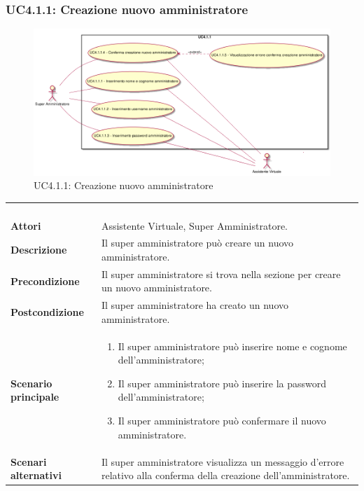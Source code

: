 \newpage\subsubsection{UC4.1.1: Creazione nuovo amministratore}
\label{UC4.1.1}
\begin{figure}[h]
\centering
\includegraphics[width=\textwidth,height=\textheight,keepaspectratio]{images/UseCaseUC411.png}
\caption{UC4.1.1: Creazione nuovo amministratore}
\end{figure}
\begin{longtable}{l|p{10cm}}
\rowcolor[gray]{0.8} \multicolumn{2}{c}{} \\
\rowcolor[gray]{0.8} \multicolumn{2}{c}{\textbf{UC4.1.1 - Creazione nuovo amministratore}} \\
\rowcolor[gray]{0.8} \multicolumn{2}{c}{} \\
\hline
&\\
\textbf{Attori} & Assistente Virtuale, Super Amministratore.\\[7pt]
\textbf{Descrizione} & Il super amministratore può creare un nuovo amministratore.\\[7pt]
\textbf{Precondizione} & Il super amministratore si trova nella sezione per creare un nuovo amministratore.\\[7pt]
\textbf{Postcondizione} & Il super amministratore ha creato un nuovo amministratore.\\[7pt]
\textbf{Scenario principale} &\begin{enumerate}
\item  Il super amministratore può inserire nome e cognome dell'amministratore;
\item  Il super amministratore può inserire la password dell'amministratore;
\item  Il super amministratore può confermare il nuovo amministratore.
\end{enumerate}
\\[7pt]
\textbf{Scenari alternativi} & Il super amministratore visualizza un messaggio d'errore relativo alla conferma della creazione dell'amministratore.\\[7pt]\hline
\end{longtable}

